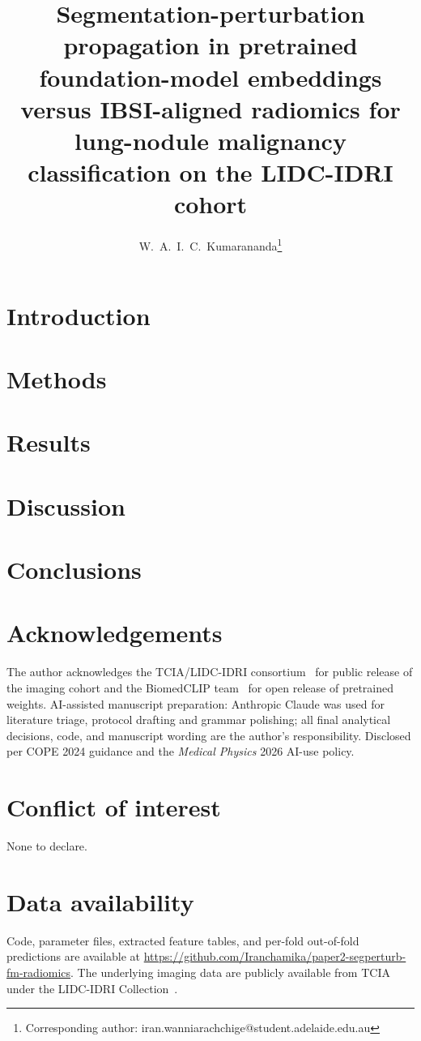 \documentclass[11pt,a4paper]{article}
\title{\bfseries Segmentation-perturbation propagation in pretrained foundation-model embeddings versus IBSI-aligned radiomics for lung-nodule malignancy classification on the LIDC-IDRI cohort}
\author[1]{W.~A.~I.~C.~Kumarananda\thanks{Corresponding author: iran.wanniarachchige@student.adelaide.edu.au}}
\affil[1]{Independent Researcher, Adelaide, South Australia, Australia}
\date{}
\begin{document}
\maketitle



\section{Introduction}


\section{Methods}


\section{Results}


\section{Discussion}


\section{Conclusions}


\section*{Acknowledgements}
The author acknowledges the TCIA/LIDC-IDRI consortium~\cite{armato2011,clark2013} for public release of the imaging cohort and the BiomedCLIP team~\cite{zhang2024biomedclip} for open release of pretrained weights. AI-assisted manuscript preparation: Anthropic Claude was used for literature triage, protocol drafting and grammar polishing; all final analytical decisions, code, and manuscript wording are the author's responsibility. Disclosed per COPE 2024 guidance and the \emph{Medical Physics} 2026 AI-use policy.

\section*{Conflict of interest}
None to declare.

\section*{Data availability}
Code, parameter files, extracted feature tables, and per-fold out-of-fold predictions are available at \url{https://github.com/Iranchamika/paper2-segperturb-fm-radiomics}. The underlying imaging data are publicly available from TCIA under the LIDC-IDRI Collection~\cite{armato2011}.



\end{document}

